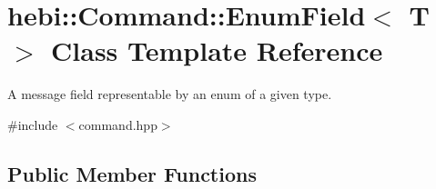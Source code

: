 \hypertarget{classhebi_1_1Command_1_1EnumField}{}\section{hebi\+:\+:Command\+:\+:Enum\+Field$<$ T $>$ Class Template Reference}
\label{classhebi_1_1Command_1_1EnumField}


A message field representable by an enum of a given type.  




{\ttfamily \#include $<$command.\+hpp$>$}

\subsection*{Public Member Functions}
